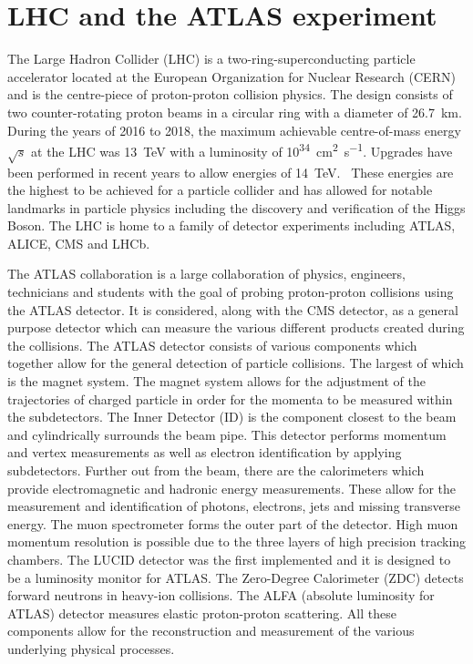 \documentclass[a4paper,11pt]{article}
\begin{document}
\section{LHC and the ATLAS experiment}\label{sec:ATLAS}
The Large Hadron Collider (LHC) is a two-ring-superconducting particle accelerator located at the European Organization for Nuclear Research (CERN) and is the centre-piece of proton-proton collision physics.
The design consists of two counter-rotating proton beams in a circular ring with a diameter of \SI{26.7}{\kilo\metre}.
During the years of 2016 to 2018, the maximum achievable centre-of-mass energy $\sqrt{s}$ at the LHC was \SI{13}{\tera\electronvolt} with a luminosity of \si{10^{34}\centi\metre\squared\per\second}.
Upgrades have been performed in recent years to allow energies of \SI{14}{\tera\electronvolt}.~\nocite{Evans:2008zzb}
These energies are the highest to be achieved for a particle collider and has allowed for notable landmarks in particle physics including the discovery and verification of the Higgs Boson.
The LHC is home to a family of detector experiments including ATLAS, ALICE, CMS and LHCb.

\nocite{Atlas2008}
The ATLAS collaboration is a large collaboration of physics, engineers, technicians and students with the goal of probing proton-proton collisions using the ATLAS detector.
It is considered, along with the CMS detector, as a general purpose detector which can measure the various different products created during the collisions.
The ATLAS detector consists of various components which together allow for the general detection of particle collisions.
The largest of which is the magnet system.
The magnet system allows for the adjustment of the trajectories of charged particle in order for the momenta to be measured within the subdetectors.
The Inner Detector (ID) is the component closest to the beam and cylindrically surrounds the beam pipe.
This detector performs momentum and vertex measurements as well as electron identification by applying subdetectors.
Further out from the beam, there are the calorimeters which provide electromagnetic and hadronic energy measurements.
These allow for the measurement and identification of photons, electrons, jets and missing transverse energy.
The muon spectrometer forms the outer part of the detector.
High muon momentum resolution is possible due to the three layers of high precision tracking chambers.
The LUCID detector was the first implemented and it is designed to be a luminosity monitor for ATLAS.
The Zero-Degree Calorimeter (ZDC) detects forward neutrons in heavy-ion collisions.
The ALFA (absolute luminosity for ATLAS) detector measures elastic proton-proton scattering.
All these components allow for the reconstruction and measurement of the various underlying physical processes.
\end{document}
